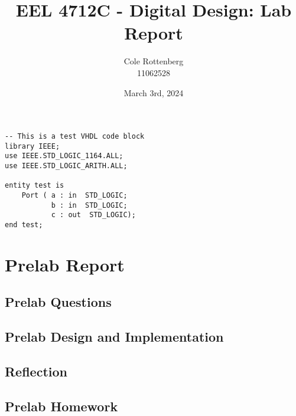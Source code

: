 \documentclass{article}
\title{EEL 4712C - Digital Design: Lab Report}
\author{Cole Rottenberg \\ 11062528}
\date{March 3rd, 2024}
\begin{document}
\maketitle

\begin{lstlisting}[caption=Test VHDL Code, label=lst:test-vhdl-code]
-- This is a test VHDL code block
library IEEE;
use IEEE.STD_LOGIC_1164.ALL;
use IEEE.STD_LOGIC_ARITH.ALL;

entity test is
    Port ( a : in  STD_LOGIC;
           b : in  STD_LOGIC;
           c : out  STD_LOGIC);
end test;
\end{lstlisting}

\section*{Prelab Report}

\subsection*{Prelab Questions}

\subsection*{Prelab Design and Implementation}

\subsection*{Reflection}

\subsection*{Prelab Homework}
\end{document}
